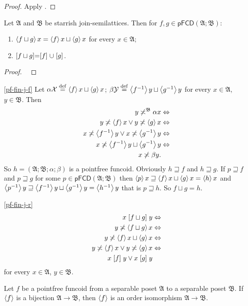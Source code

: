 \begin{proof}
Apply \cite{pm:complete-lattice-criteria}.\end{proof}
\begin{thm}
\label{pf-fin-join}Let $\mathfrak{A}$ and $\mathfrak{B}$ be starrish
join-semilattices. Then for $f,g\in\mathsf{pFCD}(\mathfrak{A};\mathfrak{B})$:
\begin{enumerate}
\item \label{pf-fin-j-f}$\left\langle f\sqcup g\right\rangle x=\left\langle f\right\rangle x\sqcup\left\langle g\right\rangle x$
for every $x\in\mathfrak{A}$;
\item \label{pf-fin-j-r}$\mathrel{\left[f\sqcup g\right]}=\mathrel{\left[f\right]}\cup\mathrel{\left[g\right]}$.
\end{enumerate}
\end{thm}
\begin{proof}
~\end{proof}
\begin{widedisorder}
\item [{\ref{pf-fin-j-f}}] Let $\alpha\mathcal{X}\overset{\mathrm{def}}{=}\left\langle f\right\rangle x\sqcup\left\langle g\right\rangle x$;
$\beta\mathcal{Y}\overset{\mathrm{def}}{=}\left\langle f^{-1}\right\rangle y\sqcup\left\langle g^{-1}\right\rangle y$ for
every $x\in\mathfrak{A}$, $y\in\mathfrak{B}$. Then
\begin{align*}
y\not\asymp^{\mathfrak{B}}\alpha x & \Leftrightarrow\\
y\not\asymp\left\langle f\right\rangle x\lor y\not\asymp\left\langle g\right\rangle x & \Leftrightarrow\\
x\not\asymp\left\langle f^{-1}\right\rangle y\lor x\not\asymp\left\langle g^{-1}\right\rangle y & \Leftrightarrow\\
x\not\asymp\left\langle f^{-1}\right\rangle y\sqcup\left\langle g^{-1}\right\rangle y & \Leftrightarrow\\
x\not\asymp\beta y.
\end{align*}
So $h=(\mathfrak{A};\mathfrak{B};\alpha;\beta)$ is a pointfree funcoid.
Obviously $h\sqsupseteq f$ and $h\sqsupseteq g$. If $p\sqsupseteq f$
and $p\sqsupseteq g$ for some $p\in\mathsf{pFCD}(\mathfrak{A};\mathfrak{B})$
then $\left\langle p\right\rangle x\sqsupseteq\left\langle f\right\rangle x\sqcup\left\langle g\right\rangle x=\left\langle h\right\rangle x$
and $\left\langle p^{-1}\right\rangle y\sqsupseteq\left\langle f^{-1}\right\rangle y\sqcup\left\langle g^{-1}\right\rangle y=\left\langle h^{-1}\right\rangle y$
that is $p\sqsupseteq h$. So $f\sqcup g=h$.
\item [{\ref{pf-fin-j-r}}] ~
\begin{align*}
x\mathrel{\left[f\sqcup g\right]}y & \Leftrightarrow\\
y\not\asymp\left\langle f\sqcup g\right\rangle x & \Leftrightarrow\\
y\not\asymp\left\langle f\right\rangle x\sqcup\left\langle g\right\rangle x & \Leftrightarrow\\
y\not\asymp\left\langle f\right\rangle x\lor y\not\asymp\left\langle g\right\rangle x & \Leftrightarrow\\
x\mathrel{\left[f\right]}y\lor x\mathrel{\left[g\right]}y
\end{align*}
for every $x\in\mathfrak{A}$, $y\in\mathfrak{B}$.\end{widedisorder}
\begin{cor}
Let $f$ be a pointfree funcoid from a separable poset $\mathfrak{A}$
to a separable poset $\mathfrak{B}$. If $\left\langle f\right\rangle$ is a bijection
$\mathfrak{A}\rightarrow\mathfrak{B}$, then $\left\langle f\right\rangle$ is an order
isomorphism $\mathfrak{A}\rightarrow\mathfrak{B}$.
\end{cor}


